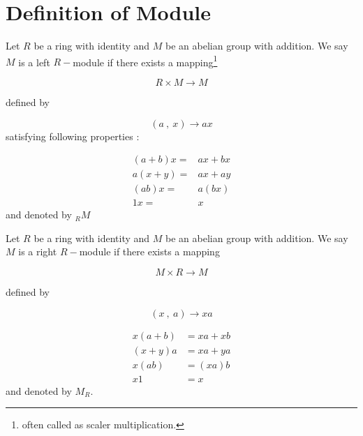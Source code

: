 \section{\textbf{Definition of Module}}

\begin{defn}

Let $ R $ be a ring with identity and $ M $ be an abelian group with addition. We say $ M $ is a left $R-$module if there exists a mapping\footnote{often called as scaler multiplication.}

\begin{equation*}
R \times M \rightarrow M
\end{equation*}
	
defined by

\begin{equation*}
(a \ , \ x) \rightarrow ax
\end{equation*}
satisfying following properties :

\begin{align}
(a+b) x =& ax + bx \\ a(x+y) =& ax + ay \\ (ab)x =& a(bx) \\ 1x =& x
\end{align}
and denoted by $_{R}M$

\end{defn}
\bigskip

\begin{defn}
 Let $ R $ be a ring with identity and $ M $ be an abelian group with addition. We say $ M $ is a right $R-$module if there exists a mapping

\begin{equation*}
M \times R \rightarrow M
\end{equation*}
	
defined by

\begin{equation*}
(x \ ,\ a) \rightarrow xa

\end{equation*}

\begin{align}
x (a+b)  &= xa + xb \\ (x+y) a &= xa + ya \\ x (ab) &= (xa)b \\ x1 &= x

\end{align}
and denoted by $M_{R}$.         
\end{defn}

